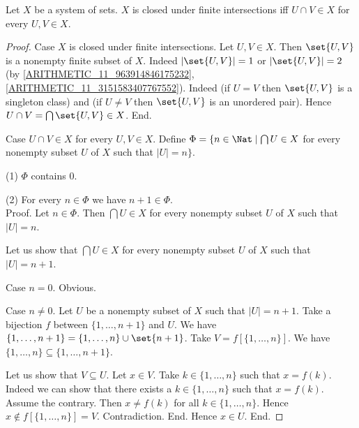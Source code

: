 \begin{forthel}
  \begin{proposition}
    Let $X$ be a system of sets.
    $X$ is closed under finite intersections iff $U \cap V \in X$ for every $U, V \in X$.
  \end{proposition}
  \begin{proof}
    Case $X$ is closed under finite intersections.
      Let $U, V \in X$.
      Then $\set{U, V}$ is a nonempty finite subset of $X$.
      Indeed $|\set{U, V}| = 1$ or $|\set{U, V}| = 2$ (by \cref{ARITHMETIC_11_963914846175232}, \cref{ARITHMETIC_11_3151583407767552}).
      Indeed (if $U = V$ then $\set{U, V}$ is a singleton class) and (if $U \neq V$ then $\set{U, V}$ is an unordered pair).
      Hence $U \cap V = \bigcap \set{U, V} \in X$.
    End.

    Case $U \cap V \in X$ for every $U, V \in X$.
      Define $\Phi = \{ n \in \Nat \mid \bigcap U \in X$ for every nonempty
      subset $U$ of $X$ such that $|U| = n \}$.

      (1) $\Phi$ contains $0$.

      (2) For every $n \in \Phi$ we have $n + 1 \in \Phi$. \\
      Proof.
        Let $n \in \Phi$.
        Then $\bigcap U \in X$ for every nonempty subset $U$ of $X$ such that
        $|U| = n$.

        Let us show that $\bigcap U \in X$ for every nonempty subset $U$ of
        $X$ such that $|U| = n + 1$.

          Case $n = 0$. Obvious.

          Case $n \neq 0$.
            Let $U$ be a nonempty subset of $X$ such that $|U| = n + 1$.
            Take a bijection $f$ between $\{1, \dots, n + 1 \}$ and $U$.
            We have $\{ 1, \dots, n + 1 \} = \{ 1, \dots, n \} \cup \set{n + 1}$.
            Take $V = f[\{ 1, \dots, n \}]$.
            We have $\{ 1, \dots, n \} \subseteq \{ 1, \dots, n + 1 \}$.

            Let us show that $V \subseteq U$.
              Let $x \in V$.
              Take $k \in \{ 1, \dots, n \}$ such that $x = f(k)$.
              Indeed we can show that there exists a $k \in \{ 1, \dots, n \}$ such that $x = f(k)$.
                Assume the contrary.
                Then $x \neq f(k)$ for all $k \in \{ 1, \dots, n \}$.
                Hence $x \notin f[\{ 1, \dots, n \}] = V$.
                Contradiction.
              End.
              Hence $x \in U$.
            End.


\end{proof}
\end{forthel}
